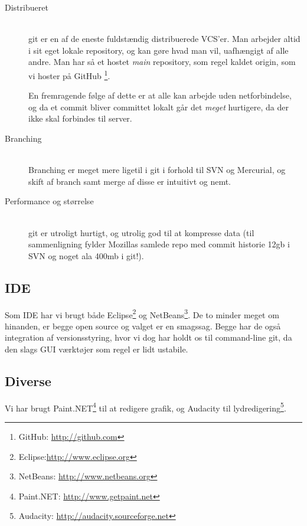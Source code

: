 \documentclass[titlepage,danish]{article}
\begin{document}
\begin{description}
  \item[Distribueret] \hfill \\
    git er en af de eneste fuldstændig distribuerede VCS'er. Man arbejder altid i sit eget lokale
    repository, og kan gøre hvad man vil, uafhængigt af alle andre. Man har så et hostet
    \emph{main} repository, som regel kaldet origin, som vi hoster på GitHub \footnote{GitHub:
      \url{http://github.com}}. 

    En fremragende følge af dette er at alle kan arbejde uden netforbindelse, og da et commit bliver
    committet lokalt går det \emph{meget} hurtigere, da der ikke skal forbindes til server.

  \item[Branching] \hfill \\
    Branching er meget mere ligetil i git i forhold til SVN og Mercurial, og skift af branch samt
    merge af disse er intuitivt og nemt.

  \item[Performance og størrelse] \hfill \\
    git er utroligt hurtigt, og utrolig god til at kompresse data (til sammenligning fylder Mozillas
    samlede repo med commit historie 12gb i SVN og noget ala 400mb i git!).
\end{description}

\subsection{IDE}
Som IDE har vi brugt både Eclipse\footnote{Eclipse:\url{http://www.eclipse.org}} og
NetBeans\footnote{NetBeans: \url{http://www.netbeans.org}}. De to minder meget om hinanden, er begge
open source og valget er en smagssag. Begge har de også integration af versionsstyring, hvor vi dog
har holdt os til command-line git, da den slags GUI værktøjer som regel er lidt ustabile.

\subsection{Diverse}
Vi har brugt Paint.NET\footnote{Paint.NET: \url{http://www.getpaint.net}} til at redigere grafik, og
Audacity til lydredigering\footnote{Audacity: \url{http://audacity.sourceforge.net}}.
\end{document}
